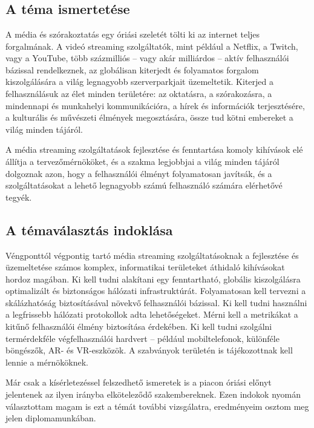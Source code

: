 \chapter{\bevezetes}

\section{A téma ismertetése}

A média és szórakoztatás egy óriási szeletét tölti ki az internet teljes forgalmának. A videó streaming szolgáltatók, mint például a Netflix, a Twitch, vagy a YouTube, több százmilliós -- vagy akár milliárdos -- aktív felhasználói bázissal rendelkeznek, az globálisan kiterjedt és folyamatos forgalom kiszolgálására a világ legnagyobb szerverparkjait üzemeltetik. Kiterjed a felhasználásuk az élet minden területére: az oktatásra, a szórakozásra, a mindennapi és munkahelyi kommunikációra, a hírek és információk terjesztésére, a kulturális és művészeti élmények megosztására, össze tud kötni embereket a világ minden tájáról.

A média streaming szolgáltatások fejlesztése és fenntartása komoly kihívások elé állítja a tervezőmérnököket, és a szakma legjobbjai a világ minden tájáról dolgoznak azon, hogy a felhasználói élményt folyamatosan javítsák, és a szolgáltatásokat a lehető legnagyobb számú felhasználó számára elérhetővé tegyék.

\section{A témaválasztás indoklása}

Véngponttól végpontig tartó média streaming szolgáltatásoknak a fejlesztése és üzemeltetése számos komplex, informatikai területeket áthidaló kihívásokat hordoz magában. Ki kell tudni alakítani egy fenntartható, globális kiszolgálásra optimalizált és biztonságos hálózati infrastruktúrát. Folyamatosan kell tervezni a skálázhatóság biztosításával növekvő felhasználói bázissal. Ki kell tudni használni a legfrissebb hálózati protokollok adta lehetőségeket. Mérni kell a metrikákat a kitűnő felhasználói élmény biztosítása érdekében. Ki kell tudni szolgálni termérdekféle végfelhasználói hardvert -- például mobiltelefonok, különféle böngészők, AR- és VR-eszközök. A szabványok területén is tájékozottnak kell lennie a mérnököknek.

Már csak a kísérletezéssel felszedhető ismeretek is a piacon óriási előnyt jelentenek az ilyen irányba elköteleződő szakembereknek. Ezen indokok nyomán választottam magam is ezt a témát további vizsgálatra, eredményeim osztom meg jelen diplomamunkában.

